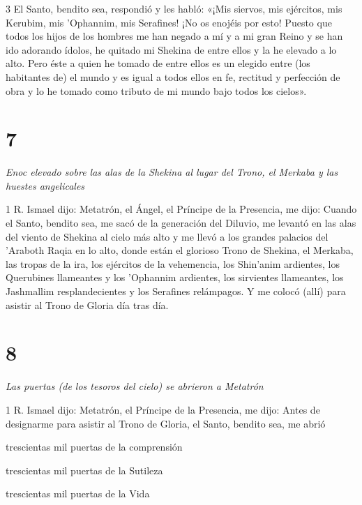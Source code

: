 \par 3 El Santo, bendito sea, respondió y les habló: «¡Mis siervos, mis ejércitos, mis Kerubim, mis 'Ophannim, mis Serafines! ¡No os enojéis por esto! Puesto que todos los hijos de los hombres me han negado a mí y a mi gran Reino y se han ido adorando ídolos, he quitado mi Shekina de entre ellos y la he elevado a lo alto. Pero éste a quien he tomado de entre ellos es un elegido entre (los habitantes de) el mundo y es igual a todos ellos en fe, rectitud y perfección de obra y lo he tomado como tributo de mi mundo bajo todos los cielos».

\chapter{7}

\par \textit{Enoc elevado sobre las alas de la Shekina al lugar del Trono, el Merkaba y las huestes angelicales}

\par 1 R. Ismael dijo: Metatrón, el Ángel, el Príncipe de la Presencia, me dijo: Cuando el Santo, bendito sea, me sacó de la generación del Diluvio, me levantó en las alas del viento de Shekina al cielo más alto y me llevó a los grandes palacios del 'Araboth Raqia en lo alto, donde están el glorioso Trono de Shekina, el Merkaba, las tropas de la ira, los ejércitos de la vehemencia, los Shin'anim ardientes, los Querubines llameantes y los 'Ophannim ardientes, los sirvientes llameantes, los Jashmallim resplandecientes y los Serafines relámpagos. Y me colocó (allí) para asistir al Trono de Gloria día tras día.

\chapter{8}

\par \textit{Las puertas (de los tesoros del cielo) se abrieron a Metatrón}

\par 1 R. Ismael dijo: Metatrón, el Príncipe de la Presencia, me dijo: Antes de designarme para asistir al Trono de Gloria, el Santo, bendito sea, me abrió

\par trescientas mil puertas de la comprensión

\par trescientas mil puertas de la Sutileza

\par trescientas mil puertas de la Vida

